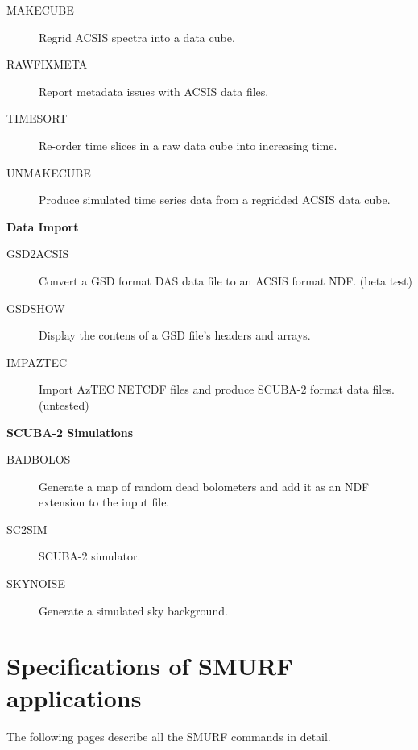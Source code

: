\documentclass[twoside,11pt]{article}
\newcommand{\htmlref}[2]{#1}
\newcommand{\xlabel}[1]{}
\renewcommand{\_}{\texttt{\symbol{95}}}
\newcommand{\classitem}[1]{\item [\htmlref{#1}{#1}]}
\begin{document}
\begin{small}
\begin{description}
\classitem{MAKECUBE}{
 Regrid ACSIS spectra into a data cube.}
\classitem{RAWFIXMETA}{
 Report metadata issues with ACSIS data files.}
\classitem{TIMESORT}{
 Re-order time slices in a raw data cube into increasing time.}
\classitem{UNMAKECUBE}{
 Produce simulated time series data from a regridded ACSIS data cube.}
\end{description}

{\large
\begin{center}
{\bf Data Import}
\end{center}
}

\begin{description}
\classitem{GSD2ACSIS}{
 Convert a GSD format DAS data file to an ACSIS format NDF. (beta test)}
\classitem{GSDSHOW}{
 Display the contens of a GSD file's headers and arrays.}
\classitem{IMPAZTEC}{
  Import AzTEC NETCDF files and produce SCUBA-2 format data files. (untested)}
\end{description}

{\large
\begin{center}
{\bf SCUBA-2 Simulations}
\end{center}
}

\begin{description}
\classitem{BADBOLOS}{
 Generate a map of random dead bolometers and add it as an NDF extension to the input file.}
\classitem{SC2SIM}{
SCUBA-2 simulator.}
\classitem{SKYNOISE}{
 Generate a simulated sky background.}
\end{description}

\end{small}

\section{\xlabel{ap_full}Specifications of SMURF applications\label{ap:full}}

The following pages describe all the SMURF commands in detail.


\end{document}
